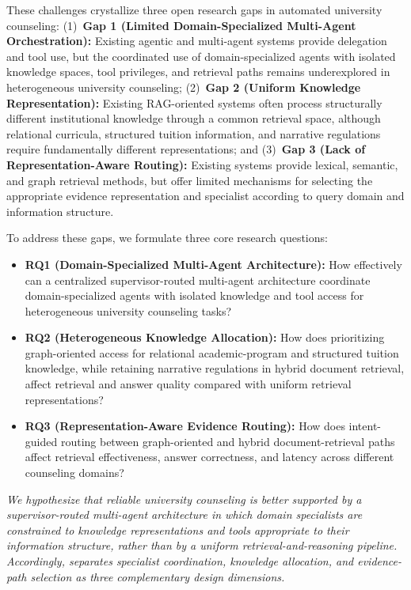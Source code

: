 These challenges crystallize three open research gaps in automated university counseling:
(1)~\textbf{Gap 1 (Limited Domain-Specialized Multi-Agent Orchestration):} Existing agentic and multi-agent systems provide delegation and tool use, but the coordinated use of domain-specialized agents with isolated knowledge spaces, tool privileges, and retrieval paths remains underexplored in heterogeneous university counseling;
(2)~\textbf{Gap 2 (Uniform Knowledge Representation):} Existing RAG-oriented systems often process structurally different institutional knowledge through a common retrieval space, although relational curricula, structured tuition information, and narrative regulations require fundamentally different representations; and
(3)~\textbf{Gap 3 (Lack of Representation-Aware Routing):} Existing systems provide lexical, semantic, and graph retrieval methods, but offer limited mechanisms for selecting the appropriate evidence representation and specialist according to query domain and information structure.

To address these gaps, we formulate three core research questions:
\begin{itemize}
    \setlength{\itemsep}{1.5pt}
    \setlength{\parsep}{0pt}
    \setlength{\parskip}{0pt}
    \item \textbf{RQ1 (Domain-Specialized Multi-Agent Architecture):} How effectively can a centralized supervisor-routed multi-agent architecture coordinate domain-specialized agents with isolated knowledge and tool access for heterogeneous university counseling tasks?
    \item \textbf{RQ2 (Heterogeneous Knowledge Allocation):} How does prioritizing graph-oriented access for relational academic-program and structured tuition knowledge, while retaining narrative regulations in hybrid document retrieval, affect retrieval and answer quality compared with uniform retrieval representations?
    \item \textbf{RQ3 (Representation-Aware Evidence Routing):} How does intent-guided routing between graph-oriented and hybrid document-retrieval paths affect retrieval effectiveness, answer correctness, and latency across different counseling domains?
\end{itemize}

\emph{We hypothesize that reliable university counseling is better supported by a supervisor-routed multi-agent architecture in which domain specialists are constrained to knowledge representations and tools appropriate to their information structure, rather than by a uniform retrieval-and-reasoning pipeline. Accordingly, \system{} separates specialist coordination, knowledge allocation, and evidence-path selection as three complementary design dimensions.}

